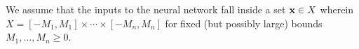\begin{assumption}\label{assum:nn}
We assume that the inputs to the neural network fall inside a set $\mathbf{x} \in X$ wherein $X = [-M_1, M_1] \times \cdots \times [-M_n, M_n]$ for fixed (but possibly large) bounds  $M_1, \ldots, M_n \geq 0$.
\end{assumption}


